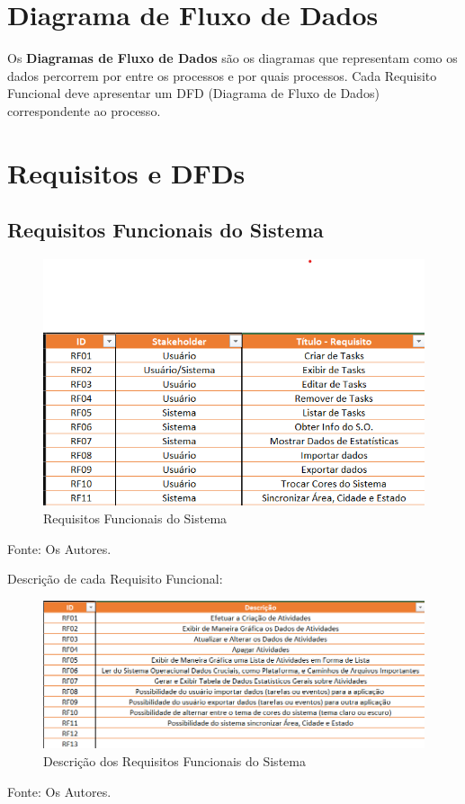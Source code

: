 \documentclass[a4paper,12pt]{article}
\begin{document}
\section{Diagrama de Fluxo de Dados}
Os \textbf{Diagramas de Fluxo de Dados} são os diagramas que representam como os dados percorrem por entre os processos e por quais processos. 
Cada Requisito Funcional deve apresentar um DFD (Diagrama de Fluxo de Dados) correspondente ao processo.

\section{Requisitos e DFDs}
\subsection{Requisitos Funcionais do Sistema}
\begin{figure}[H]
	\centering
	\includegraphics[scale=0.80]{requirements/functionals/requirements.png}
	\caption{Requisitos Funcionais do Sistema}
\end{figure}
\noindent Fonte: Os Autores.


Descrição de cada Requisito Funcional:
\begin{figure}[H]
	\centering
	\includegraphics[scale=0.80]{requirements/functionals/description.png}
	\caption{Descrição dos Requisitos Funcionais do Sistema}
\end{figure}
\noindent Fonte: Os Autores.
\end{document}
